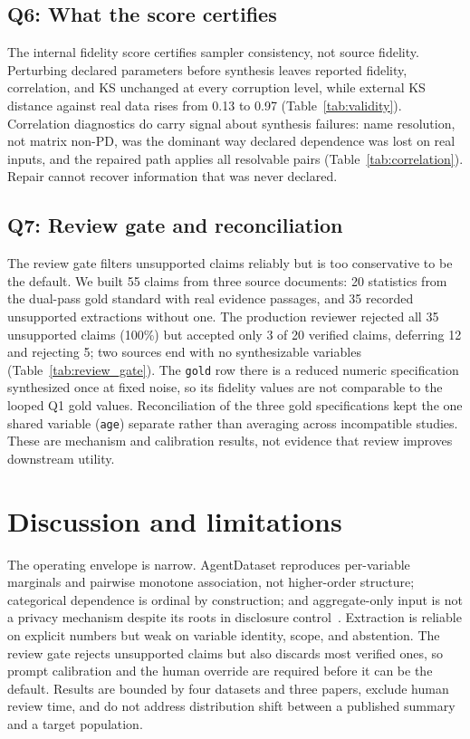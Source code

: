 \documentclass[letterpaper]{article}
\begin{document}
\subsection{Q6: What the score certifies}
\label{sec:q6}

The internal fidelity score certifies sampler consistency, not source fidelity. Perturbing declared
parameters before synthesis leaves reported fidelity, correlation, and KS unchanged at every
corruption level, while external KS distance against real data rises from 0.13 to 0.97
(Table~\ref{tab:validity}). Correlation diagnostics do carry signal about synthesis failures: name
resolution, not matrix non-PD, was the dominant way declared dependence was lost on real inputs,
and the repaired path applies all resolvable pairs (Table~\ref{tab:correlation}). Repair cannot
recover information that was never declared.

\subsection{Q7: Review gate and reconciliation}
\label{sec:q7}

The review gate filters unsupported claims reliably but is too conservative to be the default. We
built 55 claims from three source documents: 20 statistics from the dual-pass gold standard with
real evidence passages, and 35 recorded unsupported extractions without one. The production
reviewer rejected all 35 unsupported claims (100\%) but accepted only 3 of 20 verified claims,
deferring 12 and rejecting 5; two sources end with no synthesizable variables
(Table~\ref{tab:review_gate}). The \texttt{gold} row there is a reduced numeric specification
synthesized once at fixed noise, so its fidelity values are not comparable to the looped Q1 gold
values. Reconciliation of the three gold specifications kept the one shared variable
(\texttt{age}) separate rather than averaging across incompatible studies. These are mechanism
and calibration results, not evidence that review improves downstream utility.

\section{Discussion and limitations}
\label{sec:discussion}

The operating envelope is narrow. AgentDataset reproduces per-variable marginals and pairwise
monotone association, not higher-order structure; categorical dependence is ordinal by
construction; and aggregate-only input is not a privacy mechanism despite its roots in disclosure
control~\citep{hundepool2012,rubin1993,taub2018}. Extraction is reliable on explicit numbers but
weak on variable identity, scope, and abstention. The review gate rejects unsupported claims but
also discards most verified ones, so prompt calibration and the human override are required before
it can be the default. Results are bounded by four datasets and three papers, exclude human review
time, and do not address distribution shift between a published summary and a target population.
\end{document}
